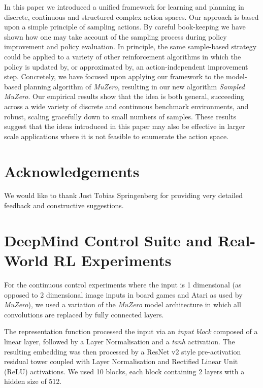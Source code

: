 \documentclass{article}
\newcommand{\muzero}{\emph{MuZero}}
\newcommand{\smuzero}{\emph{Sampled MuZero}}
\newcommand{\dmcs}{DeepMind Control Suite }
\newcommand{\rwrl}{Real-World RL }
\begin{document}
In this paper we introduced a unified framework for learning and planning in discrete, continuous and structured complex action spaces. Our approach is based upon a simple principle of sampling actions. By careful book-keeping we have shown how one may take account of the sampling process during policy improvement and policy evaluation. In principle, the same sample-based strategy could be applied to a variety of other reinforcement algorithms in which the policy is updated by, or approximated by, an action-independent improvement step. Concretely, we have focused upon applying our framework to the model-based planning algorithm of \muzero{}, resulting in our new algorithm \smuzero{}. Our empirical results show that the idea is both general, succeeding across a wide variety of discrete and continuous benchmark environments, and robust, scaling gracefully down to small numbers of samples. These results suggest that the ideas introduced in this paper may also be effective in larger scale applications where it is not feasible to enumerate the action space.

\section*{Acknowledgements}
We would like to thank Jost Tobias Springenberg for providing very detailed feedback and constructive suggestions.




\clearpage

\appendix

\section{\dmcs and \rwrl Experiments}
\label{cs-experiments}
For the continuous control experiments where the input is 1 dimensional (as opposed to 2 dimensional image inputs in board games and Atari as used by \muzero{}), we used a variation of the \muzero{} model architecture in which all convolutions are replaced by fully connected layers.

The representation function processed the input via an \emph{input block} composed of a linear layer, followed by a Layer Normalisation and a \emph{tanh} activation. The resulting embedding was then processed by a ResNet v2 style pre-activation residual tower \cite{resv2} coupled with Layer Normalisation \cite{ba2016layer} and Rectified Linear Unit (ReLU) activations. We used 10 blocks, each block containing 2 layers with a hidden size of 512.
\end{document}
